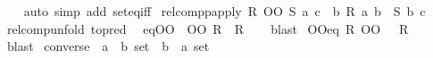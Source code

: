 \begin{isabellebody}
%
\isadelimproof
\ \ %
\endisadelimproof
%
\isatagproof
{}\isamarkupfalse%
\ {\isacharparenleft}{\kern0pt}auto\ simp\ add{\isacharcolon}{\kern0pt}\ set{\isacharunderscore}{\kern0pt}eq{\isacharunderscore}{\kern0pt}iff{\isacharparenright}{\kern0pt}%
\endisatagproof
{\isafoldproof}%
%
\isadelimproof
\isanewline
%
\endisadelimproof
\isanewline
{}\isamarkupfalse%
\ relcompp{\isacharunderscore}{\kern0pt}apply{\isacharcolon}{\kern0pt}\ {\isachardoublequoteopen}{\isacharparenleft}{\kern0pt}R\ OO\ S{\isacharparenright}{\kern0pt}\ a\ c\ {\isasymlongleftrightarrow}\ {\isacharparenleft}{\kern0pt}{\isasymexists}b{\isachardot}{\kern0pt}\ R\ a\ b\ {\isasymand}\ S\ b\ c{\isacharparenright}{\kern0pt}{\isachardoublequoteclose}\isanewline
%
\isadelimproof
\ \ %
\endisadelimproof
%
\isatagproof
{}\isamarkupfalse%
\ relcomp{\isacharunderscore}{\kern0pt}unfold\ {\isacharbrackleft}{\kern0pt}to{\isacharunderscore}{\kern0pt}pred{\isacharbrackright}{\kern0pt}\ \isacommand{{\isachardot}{\kern0pt}{\isachardot}{\kern0pt}}\isamarkupfalse%
%
\endisatagproof
{\isafoldproof}%
%
\isadelimproof
\isanewline
%
\endisadelimproof
\isanewline
{}\isamarkupfalse%
\ eq{\isacharunderscore}{\kern0pt}OO{\isacharcolon}{\kern0pt}\ {\isachardoublequoteopen}{\isacharparenleft}{\kern0pt}{\isacharequal}{\kern0pt}{\isacharparenright}{\kern0pt}\ OO\ R\ {\isacharequal}{\kern0pt}\ R{\isachardoublequoteclose}\isanewline
%
\isadelimproof
\ \ %
\endisadelimproof
%
\isatagproof
{}\isamarkupfalse%
\ blast%
\endisatagproof
{\isafoldproof}%
%
\isadelimproof
\isanewline
%
\endisadelimproof
\isanewline
{}\isamarkupfalse%
\ OO{\isacharunderscore}{\kern0pt}eq{\isacharcolon}{\kern0pt}\ {\isachardoublequoteopen}R\ OO\ {\isacharparenleft}{\kern0pt}{\isacharequal}{\kern0pt}{\isacharparenright}{\kern0pt}\ {\isacharequal}{\kern0pt}\ R{\isachardoublequoteclose}\isanewline
%
\isadelimproof
\ \ %
\endisadelimproof
%
\isatagproof
{}\isamarkupfalse%
\ blast%
\endisatagproof
{\isafoldproof}%
%
\isadelimproof
%
\endisadelimproof
%
\isadelimdocument
%
\endisadelimdocument
%
\isatagdocument
%
\isamarkuptrue%
%
\endisatagdocument
{\isafolddocument}%
%
\isadelimdocument
%
\endisadelimdocument
{}\isamarkupfalse%
\ converse\ {\isacharcolon}{\kern0pt}{\isacharcolon}{\kern0pt}\ {\isachardoublequoteopen}{\isacharparenleft}{\kern0pt}{\isacharprime}{\kern0pt}a\ {\isasymtimes}\ {\isacharprime}{\kern0pt}b{\isacharparenright}{\kern0pt}\ set\ {\isasymRightarrow}\ {\isacharparenleft}{\kern0pt}{\isacharprime}{\kern0pt}b\ {\isasymtimes}\ {\isacharprime}{\kern0pt}a{\isacharparenright}{\kern0pt}\ set{\isachardoublequoteclose}\ \ {\isacharparenleft}{\kern0pt}{\isachardoublequoteopen}{\isacharparenleft}{\kern0pt}{\isacharunderscore}{\kern0pt}{\isasyminverse}{\isacharparenright}{\kern0pt}{\isachardoublequoteclose}\ {\isacharbrackleft}{\kern0pt}{}{}{}{}{\isacharbrackright}{\kern0pt}\ {}{}{}{\isacharparenright}{\kern0pt}\isanewline

\end{isabellebody}
